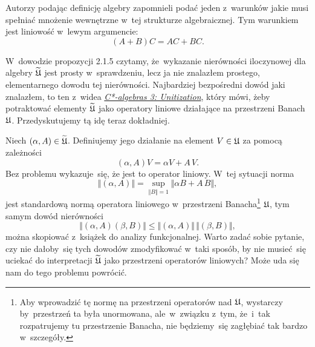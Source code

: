 \documentclass[a4paper,11pt]{article}
\begin{document}
\vspace{0em}


\noindent
{} Autorzy podając definicję algebry zapomnieli podać jeden z~warunków
jakie musi spełniać mnożenie wewnętrzne w~tej strukturze algebraicznej. Tym
warunkiem jest liniowość w~lewym argumencie:
\begin{equation}
  \label{eq:Bratteli-Robinson-Operator-Algebras-ETC-Vol-I-s01-01}
  ( A + B ) C = A C + B C.
\end{equation}

\vspace{\VerSpaceFour}




\noindent
{} W~dowodzie propozycji 2.1.5 czytamy, że~wykazanie nierówności
iloczynowej dla algebry $\widetilde{\mathfrak{U}}$ jest prosty w~sprawdzeniu, lecz ja nie
znalazłem prostego, elementarnego dowodu tej nierówności. Najbardziej
bezpośredni dowód jaki znalazłem, to ten z~widea
\href{https://www.youtube.com/watch?v=6NC0UWjDcBQ}{\textit{C*-algebras 3:
    Unitization}}, który mówi, żeby
potraktować elementy $\widetilde{\mathfrak{U}}$ jako operatory liniowe działające
na przestrzeni Banach $\mathfrak{U}$. Przedyskutujemy tą idę teraz dokładniej.

Niech $( \alpha, A ) \in \widetilde{\mathfrak{U}}$. Definiujemy jego działanie na element
$V \in \mathfrak{U}$ za pomocą zależności
\begin{equation}
  \label{eq:Bratteli-Robinson-Operator-Algebras-ETC-Vol-I-s01-02}
  ( \alpha, A ) V = \alpha V + A \, V.
\end{equation}
Bez problemu wykazuje~się, że jest to operator liniowy. W~tej sytuacji
norma
\begin{equation}
  \label{eq:Bratteli-Robinson-Operator-Algebras-ETC-Vol-I-s01-03}
  \Vert ( \alpha, A ) \Vert =
  \sup_{ \Vert B \Vert = 1 } \Vert \alpha B + A \, B \Vert,
\end{equation}
jest standardową normą operatora liniowego w~przestrzeni
Banacha\footnote{Aby wprowadzić tę normę na przestrzeni operatorów nad
  $\mathfrak{U}$, wystarczy by~przestrzeń ta była unormowana, ale~w~związku
  z~tym, że~i~tak rozpatrujemy tu przestrzenie Banacha, nie będziemy~się
  zagłębiać tak bardzo w~szczegóły.}
$\mathfrak{U}$, tym samym dowód nierówności
\begin{equation}
  \label{eq:Bratteli-Robinson-Operator-Algebras-ETC-Vol-I-s01-04}
  \Vert ( \alpha, A ) ( \beta, B ) \Vert \leq
  \Vert ( \alpha, A ) \Vert \, \Vert ( \beta, B ) \Vert,
\end{equation}
można skopiować z~książek do analizy funkcjonalnej. Warto zadać sobie
pytanie, czy nie dałoby~się tych dowodów zmodyfikować w~taki sposób, by nie
musieć~się uciekać do interpretacji $\widetilde{\mathfrak{U}}$ jako przestrzeni
operatorów liniowych? Może uda się nam do tego problemu powrócić.
\end{document}
